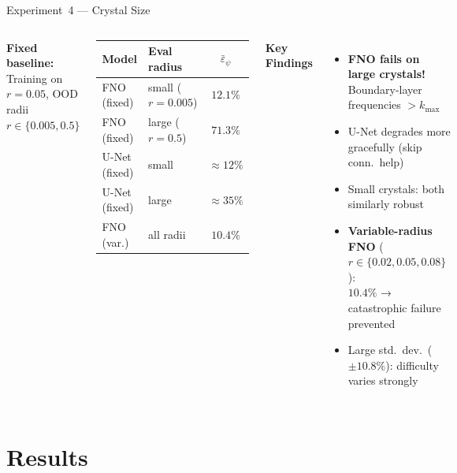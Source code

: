 \documentclass[aspectratio=169, 10pt]{beamer}
\begin{document}
\begin{frame}{Experiment~4 — Crystal Size}
  \begin{columns}[T]
      \textbf{Fixed baseline:} Training on $r=0.05$, OOD radii $r\in\{0.005, 0.5\}$

      \vspace{0.5em}
      \begin{center}
      \small
      \begin{tabular}{llc}
        \toprule
        \textbf{Model} & \textbf{Eval radius} & $\bar{\varepsilon}_\psi$ \\
        \midrule
        \textcolor{fnocolor}{FNO} (fixed) & small ($r=0.005$) & $12.1\%$ \\
        \textcolor{fnocolor}{FNO} (fixed) & large ($r=0.5$)   & $\mathbf{71.3\%}$ \\
        \textcolor{unetcolor}{U-Net} (fixed) & small          & ${\approx}12\%$ \\
        \textcolor{unetcolor}{U-Net} (fixed) & large          & ${\approx}35\%$ \\
        \midrule
        \textcolor{fnocolor}{FNO} (var.) & all radii          & $10.4\%$ \\
        \bottomrule
      \end{tabular}
      \end{center}

      \textbf{Key Findings}
      \begin{itemize}
        \item \textbf{FNO fails on large crystals!}\\
          Boundary-layer frequencies $> k_\text{max}$
        \item U-Net degrades more gracefully (skip conn.\ help)
        \item Small crystals: both similarly robust
        \item \textbf{Variable-radius FNO} ($r \in \{0.02, 0.05, 0.08\}$):\\
          $10.4\%$ → catastrophic failure prevented
        \item Large std.\ dev.\ ($\pm10.8\%$): difficulty varies strongly
      \end{itemize}
  \end{columns}
\end{frame}

\section{Results}
\end{document}
